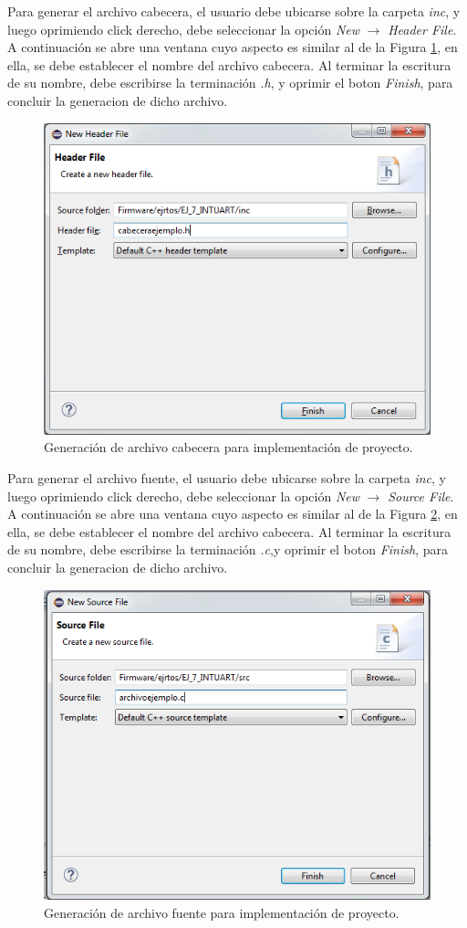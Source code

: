 \documentclass[12pt,letterpaper]{article}
\begin{document}
Para generar el archivo cabecera, el usuario debe ubicarse sobre la carpeta \textit{inc}, y luego oprimiendo click derecho, debe seleccionar la opción \textit{New} $\rightarrow$ \textit{Header File}. A continuación se abre una ventana cuyo aspecto es similar al de la Figura \ref{archivocabecera}, en ella, se debe establecer el nombre del archivo cabecera. Al terminar la escritura de su nombre, debe escribirse la terminación \textit{.h}, y oprimir el boton \textit{Finish}, para concluir la generacion de dicho archivo.

\begin{figure}[!h]
\centering
\includegraphics[width=8 cm]{figuras/f27.png}
\caption{Generación de archivo cabecera para implementación de proyecto.}
\label{archivocabecera}
\end{figure}

Para generar el archivo fuente, el usuario debe ubicarse sobre la carpeta \textit{inc}, y luego oprimiendo click derecho, debe seleccionar la opción \textit{New} $\rightarrow$ \textit{Source File}. A continuación se abre una ventana cuyo aspecto es similar al de la Figura \ref{archivofuente}, en ella, se debe establecer el nombre del archivo cabecera. Al terminar la escritura de su nombre, debe escribirse la terminación \textit{.c},y oprimir el boton \textit{Finish}, para concluir la generacion de dicho archivo.

\begin{figure}[!h]
\centering
\includegraphics[width=8 cm]{figuras/f28.png}
\caption{Generación de archivo fuente para implementación de proyecto.}
\label{archivofuente}
\end{figure}
\end{document}
